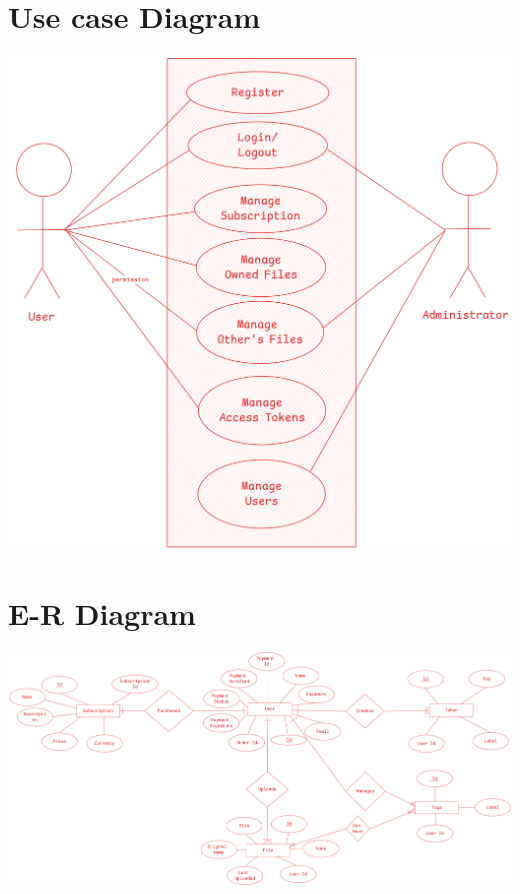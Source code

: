 \documentclass[12pt,a4paper]{report}
\begin{document}
\section{Use case Diagram}\label{sec:use_case_diagram}
\includegraphics[width=\textwidth]{use-case.png}
\section{E-R Diagram}\label{sec:normalisation_and_er_diagram}
\includegraphics[width=\textwidth]{erd.png}
\end{document}
